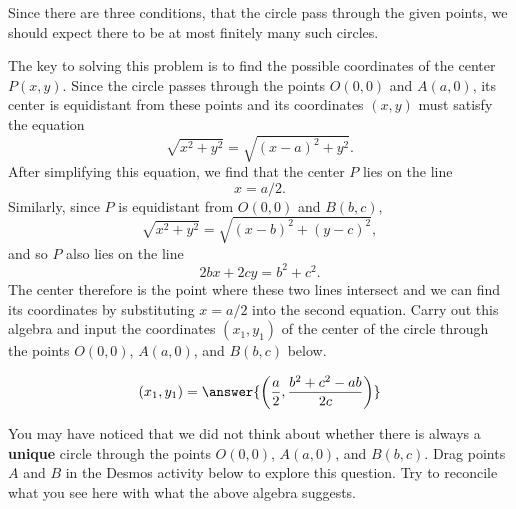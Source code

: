\documentclass{ximera}
\begin{document}
\begin{explanation}
Since there are three conditions, that the circle pass through the given points, we should expect there to be at most finitely many such circles. 

The key to solving this problem is to find the possible coordinates of the center $P(x,y)$. Since the circle passes through the points $O(0,0)$ and $A(a,0)$, its center is equidistant from these points and its coordinates $(x,y)$ must satisfy the equation
\[
    \sqrt{x^2 + y^2} = \sqrt{(x-a)^2+y^2} .
\]
After simplifying this equation, we find that the center $P$ lies on the line  
\[
   x = a/2.
\]
Similarly, since $P$ is equidistant from $O(0,0)$ and $B(b,c)$,
\[
  \sqrt{x^2 + y^2} = \sqrt{(x-b)^2+(y-c)^2} ,
\]
and so $P$ also lies on the line 
\[
  2bx + 2cy = b^2 + c^2 .
\]
The center therefore is the point where these two lines intersect and we can find its coordinates by substituting $x=a/2$ into the second equation. Carry out this algebra and input the coordinates $(x_1,y_1)$ of the center of the circle through the points $O(0,0)$, $A(a,0)$, and $B(b,c)$ below.

\begin{question}
\[
  (x_1, y_1) = \answer{ \left( \frac{a}{2}  ,  \frac{b^2+c^2-ab}{2c}   \right)} 
\]
\end{question}





\begin{exploration}\label{exp:circle7}
You may have noticed that we did not think about whether there is always a {\bf unique} circle through the points $O(0,0)$, $A(a,0)$, and $B(b,c)$. Drag points $A$ and $B$ in the Desmos activity below to explore this question. Try to reconcile what you see here with what the above algebra suggests.
 
 
\begin{onlineOnly}
    \begin{center}
\end{center}
\end{onlineOnly}
\end{exploration}

\end{explanation}
\end{document}
